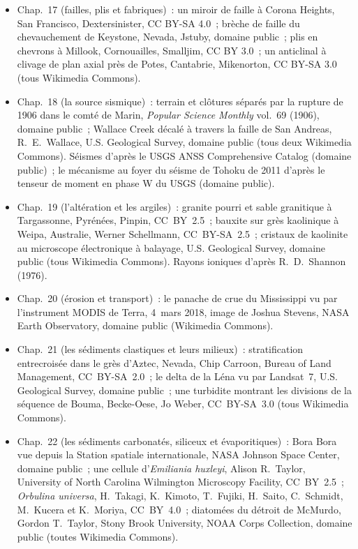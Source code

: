 \begin{itemize}
  \item Chap.~17 (failles, plis et fabriques)~: un miroir de faille à Corona Heights, San Francisco, Dextersinister, CC BY-SA 4.0~; brèche de faille du chevauchement de Keystone, Nevada, Jstuby, domaine public~; plis en chevrons à Millook, Cornouailles, Smalljim, CC BY 3.0~; un anticlinal à clivage de plan axial près de Potes, Cantabrie, Mikenorton, CC BY-SA 3.0 (tous Wikimedia Commons).
  \item Chap.~18 (la source sismique)~: terrain et clôtures séparés par la rupture de 1906 dans le comté de Marin, \emph{Popular Science Monthly} vol.~69 (1906), domaine public~; Wallace Creek décalé à travers la faille de San Andreas, R.~E.~Wallace, U.S. Geological Survey, domaine public (tous deux Wikimedia Commons). Séismes d'après le USGS ANSS Comprehensive Catalog (domaine public)~; le mécanisme au foyer du séisme de Tohoku de 2011 d'après le tenseur de moment en phase W du USGS (domaine public).
  \item Chap.~19 (l'altération et les argiles)~: granite pourri et sable granitique à Targassonne, Pyrénées, Pinpin, CC~BY~2.5~; bauxite sur grès kaolinique à Weipa, Australie, Werner Schellmann, CC~BY-SA~2.5~; cristaux de kaolinite au microscope électronique à balayage, U.S. Geological Survey, domaine public (tous Wikimedia Commons). Rayons ioniques d'après R.~D.~Shannon (1976).
  \item Chap.~20 (érosion et transport)~: le panache de crue du Mississippi vu par l'instrument MODIS de Terra, 4~mars 2018, image de Joshua Stevens, NASA Earth Observatory, domaine public (Wikimedia Commons).
  \item Chap.~21 (les sédiments clastiques et leurs milieux)~: stratification entrecroisée dans le grès d'Aztec, Nevada, Chip Carroon, Bureau of Land Management, CC~BY-SA~2.0~; le delta de la Léna vu par Landsat~7, U.S. Geological Survey, domaine public~; une turbidite montrant les divisions de la séquence de Bouma, Becke-Oese, Jo Weber, CC~BY-SA~3.0 (tous Wikimedia Commons).
  \item Chap.~22 (les sédiments carbonatés, siliceux et évaporitiques)~: Bora Bora vue depuis la Station spatiale internationale, NASA Johnson Space Center, domaine public~; une cellule d'\emph{Emiliania huxleyi}, Alison R.~Taylor, University of North Carolina Wilmington Microscopy Facility, CC~BY~2.5~; \emph{Orbulina universa}, H.~Takagi, K.~Kimoto, T.~Fujiki, H.~Saito, C.~Schmidt, M.~Kucera et K.~Moriya, CC~BY~4.0~; diatomées du détroit de McMurdo, Gordon T.~Taylor, Stony Brook University, NOAA Corps Collection, domaine public (toutes Wikimedia Commons).

\end{itemize}
